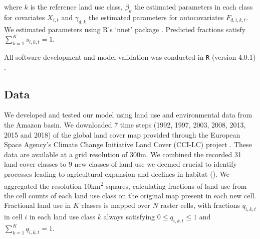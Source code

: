 \documentclass[titlesmallcaps,copyrightpage]{uomthesis}\usepackage[]{graphicx}\usepackage[]{color}
\begin{document}
where \(k\) is the reference land use class, \(\beta_{k}\) the estimated
parameters in each class for covariates \(X_{i,t}\) and \(\gamma_{d,k}\)
the estimated parameters for autocovariates \(F_{d,i,k,t}\). We
estimated parameters using R's `nnet' package
\citep{venables_modern_2002}. Predicted fractions satisfy
\(\sum_{k=1}^K s_{i,k,t} = 1\).

All software development and model validation was conducted in \texttt{R} (version 4.0.1) \citep{r_development_core_team_r_2008}.

\subsection{Data}

We developed and tested our model using land use and environmental data
from the Amazon basin. We downloaded 7 time steps (1992, 1997, 2003,
2008, 2013, 2015 and 2018) of the global land cover map provided through
the European Space Agency's Climate Change Initiative Land Cover
(CCI-LC) project \citep{esa_land_2019}. These data are available at a
grid resolution of 300m. We combined the recorded 31 land cover classes
to 9 new classes of land use we deemed crucial to identify processes
leading to agricultural expansion and declines in habitat (). We aggregated the resolution
10km\textsuperscript{2} squares, calculating fractions of land use from
the cell counts of each land use class on the original map present in
each new cell. Fractional land use in \(K\) classes is mapped over \(N\)
raster cells, with fractions \(q_{i,k,t}\) in cell \(i\) in each land
use class \(k\) always satisfying \(0\leqslant q_{i,k,t}\leqslant 1\)
and \(\sum_{k=1}^K q_{i,k,t} = 1\).
\end{document}
